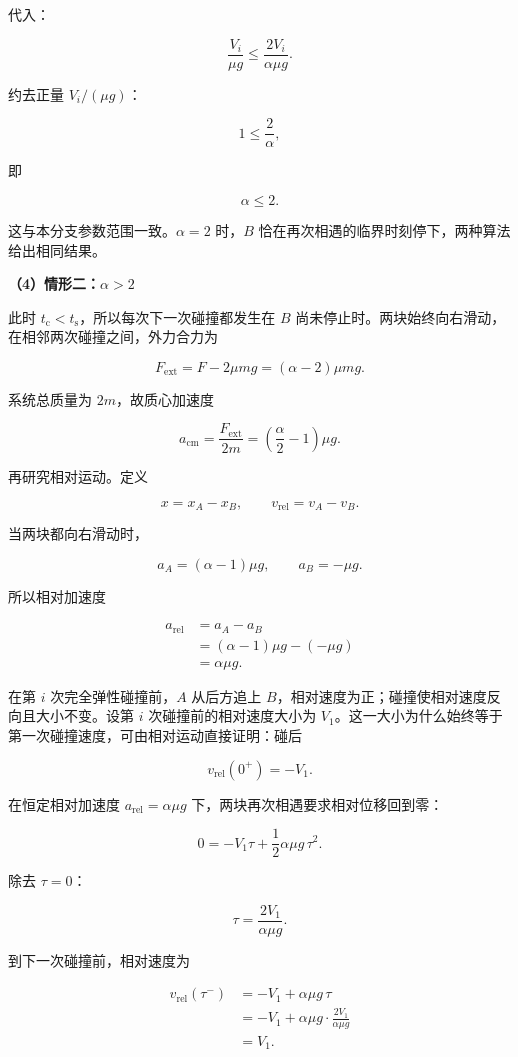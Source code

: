 \documentclass[12pt,a4paper,UTF8]{ctexart}
\begin{document}
代入：

\[\frac{V_i}{\mu g}
\leq\frac{2V_i}{\alpha\mu g}.\]

约去正量 \(V_i/(\mu g)\)：

\[1\leq\frac2\alpha,\]

即

\[\alpha\leq2.\]

这与本分支参数范围一致。\(\alpha=2\) 时，\(B\)
恰在再次相遇的临界时刻停下，两种算法给出相同结果。

\textbf{（4）情形二：\(\alpha>2\)}

此时 \(t_{\mathrm c}<t_{\mathrm s}\)，所以每次下一次碰撞都发生在 \(B\)
尚未停止时。两块始终向右滑动，在相邻两次碰撞之间，外力合力为

\[F_{\mathrm{ext}}=F-2\mu mg=(\alpha-2)\mu mg.\]

系统总质量为 \(2m\)，故质心加速度

\[a_{\mathrm{cm}}
=\frac{F_{\mathrm{ext}}}{2m}
=\left(\frac{\alpha}{2}-1\right)\mu g.\]

再研究相对运动。定义

\[x=x_A-x_B,\qquad v_{\mathrm{rel}}=v_A-v_B.\]

当两块都向右滑动时，

\[a_A=(\alpha-1)\mu g,\qquad a_B=-\mu g.\]

所以相对加速度

\[\begin{aligned}
a_{\mathrm{rel}}
&=a_A-a_B\\
&=(\alpha-1)\mu g-(-\mu g)\\
&=\alpha\mu g.
\end{aligned}\]

在第 \(i\) 次完全弹性碰撞前，\(A\) 从后方追上
\(B\)，相对速度为正；碰撞使相对速度反向且大小不变。设第 \(i\)
次碰撞前的相对速度大小为
\(V_1\)。这一大小为什么始终等于第一次碰撞速度，可由相对运动直接证明：碰后

\[v_{\mathrm{rel}}(0^+)=-V_1.\]

在恒定相对加速度 \(a_{\mathrm{rel}}=\alpha\mu g\)
下，两块再次相遇要求相对位移回到零：

\[0=-V_1\tau+\frac12\alpha\mu g\,\tau^2.\]

除去 \(\tau=0\)：

\[\boxed{\tau=\frac{2V_1}{\alpha\mu g}}.\]

到下一次碰撞前，相对速度为

\[\begin{aligned}
v_{\mathrm{rel}}(\tau^-)
&=-V_1+\alpha\mu g\,\tau\\
&=-V_1+\alpha\mu g
\cdot\frac{2V_1}{\alpha\mu g}\\
&=V_1.
\end{aligned}\]
\end{document}
